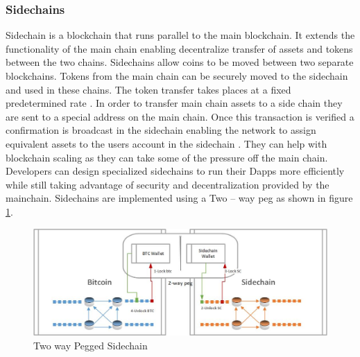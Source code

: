 \subsubsection{Sidechains} \label{SIDE} 
Sidechain is a blockchain that runs parallel to the main blockchain. It extends the functionality of the main chain enabling decentralize transfer of assets and tokens between the two chains. Sidechains allow coins to be moved between two separate blockchains. Tokens from the main chain can be securely moved to the sidechain and used in these chains. The token transfer takes places at a fixed predetermined rate \cite{misc:013}. In order to transfer main chain assets to a side chain they are sent to a special address on the main chain. Once this transaction is verified a confirmation is broadcast in the sidechain enabling the network to assign equivalent assets to the users account in the sidechain \cite{paper:004}. They can help with blockchain scaling as they can take some of the pressure off the main chain. Developers can design specialized sidechains to run their Dapps more efficiently while still taking advantage of security and decentralization provided by the mainchain. Sidechains are implemented using a Two – way peg as shown in figure \ref{fig:SC}.
\vspace{3cm}  
\begin{figure}[h]
	\centering
    \includegraphics[width=180mm,scale=1]{figs/sidechain}
	\caption{Two way Pegged Sidechain }
	\label{fig:SC}
\end{figure}



